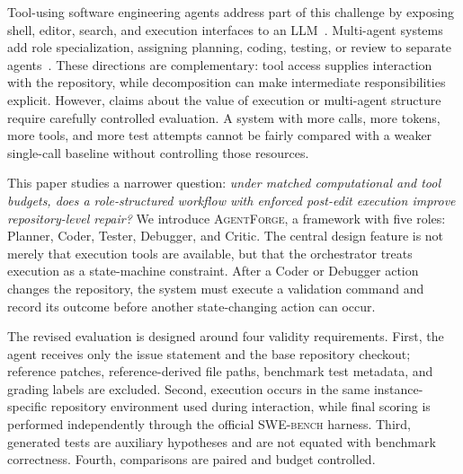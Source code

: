 \documentclass[journal]{IEEEtran}
\newcommand{\agentforge}{\textsc{AgentForge}}
\newcommand{\swebench}{\textsc{SWE-bench}}
\begin{document}
Tool-using software engineering agents address part of this challenge by exposing shell, editor, search, and execution interfaces to an LLM~\cite{yang2024sweagent,wang2024openhands,zhang2024autocoderover}. Multi-agent systems add role specialization, assigning planning, coding, testing, or review to separate agents~\cite{tao2024magis,khanzadeh2025agentmesh,hong2023metagpt,qian2023chatdev}. These directions are complementary: tool access supplies interaction with the repository, while decomposition can make intermediate responsibilities explicit. However, claims about the value of execution or multi-agent structure require carefully controlled evaluation. A system with more calls, more tokens, more tools, and more test attempts cannot be fairly compared with a weaker single-call baseline without controlling those resources.

This paper studies a narrower question: \emph{under matched computational and tool budgets, does a role-structured workflow with enforced post-edit execution improve repository-level repair?} We introduce \agentforge{}, a framework with five roles: Planner, Coder, Tester, Debugger, and Critic. The central design feature is not merely that execution tools are available, but that the orchestrator treats execution as a state-machine constraint. After a Coder or Debugger action changes the repository, the system must execute a validation command and record its outcome before another state-changing action can occur.

The revised evaluation is designed around four validity requirements. First, the agent receives only the issue statement and the base repository checkout; reference patches, reference-derived file paths, benchmark test metadata, and grading labels are excluded. Second, execution occurs in the same instance-specific repository environment used during interaction, while final scoring is performed independently through the official \swebench{} harness. Third, generated tests are auxiliary hypotheses and are not equated with benchmark correctness. Fourth, comparisons are paired and budget controlled.
\end{document}
